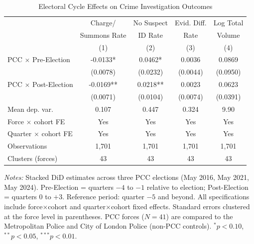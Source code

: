 \begin{table}[htbp]
\centering
\caption{Electoral Cycle Effects on Crime Investigation Outcomes}
\label{tab:main}
\begin{tabular}{lcccc}
\hline\hline
 & Charge/ & No Suspect & Evid. Diff. & Log Total \\
 & Summons Rate & ID Rate & Rate & Volume \\
 & (1) & (2) & (3) & (4) \\
\hline
PCC $\times$ Pre-Election & -0.0133* & 0.0462* & 0.0036 & 0.0869 \\
 & (0.0078) & (0.0232) & (0.0044) & (0.0950) \\
PCC $\times$ Post-Election & -0.0169** & 0.0218** & 0.0023 & 0.0623 \\
 & (0.0071) & (0.0104) & (0.0074) & (0.0391) \\
\hline
Mean dep. var. & 0.107 & 0.447 & 0.324 & 9.90 \\
Force $\times$ cohort FE & Yes & Yes & Yes & Yes \\
Quarter $\times$ cohort FE & Yes & Yes & Yes & Yes \\
Observations & 1,701 & 1,701 & 1,701 & 1,701 \\
Clusters (forces) & 43 & 43 & 43 & 43 \\
\hline\hline
\end{tabular}
\begin{tablenotes}[flushleft]
\item \textit{Notes:} Stacked DiD estimates across three PCC elections (May 2016, May 2021, May 2024). Pre-Election = quarters $-4$ to $-1$ relative to election; Post-Election = quarters $0$ to $+3$. Reference period: quarter $-5$ and beyond. All specifications include force$\times$cohort and quarter$\times$cohort fixed effects. Standard errors clustered at the force level in parentheses. PCC forces ($N=41$) are compared to the Metropolitan Police and City of London Police (non-PCC controls). $^{*}p<0.10$, $^{**}p<0.05$, $^{***}p<0.01$.
\end{tablenotes}
\end{table}

